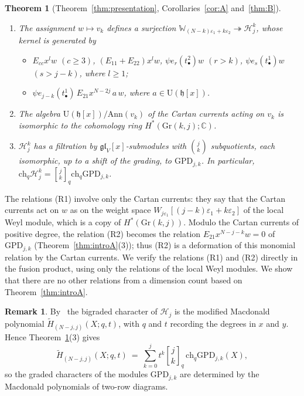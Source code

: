 \documentclass[11pt]{amsart}
\numberwithin{equation}{section}
\newtheorem{introthm}{Theorem}
\theoremstyle{definition}
\newtheorem{remark}[equation]{Remark}
\newcommand{\gl}{\mathfrak{gl}}
\newcommand{\fh}{\mathfrak{h}}
\newcommand{\U}{\mathrm{U}}
\newcommand{\bW}{\mathbb{W}}          %
\newcommand{\GPD}{\mathrm{GPD}}         %
\newcommand{\eps}{\varepsilon}
\newcommand{\ch}{\mathrm{ch}}
\newcommand{\Ann}{\mathrm{Ann}}
\newcommand{\Gr}{\mathrm{Gr}}
\newcommand{\qbinom}[2]{\genfrac{[}{]}{0pt}{}{#1}{#2}_{q}}
\begin{document}
	\begin{introthm}[Theorem~\ref{thm:presentation}, Corollaries~\ref{cor:A} and~\ref{thm:B}]\label{thm:introB}
		\begin{enumerate}
			\item The assignment $w\mapsto v_k$ defines a surjection $\bW_{(N-k)\eps_1+k\eps_2}\twoheadrightarrow\mathcal H_j^k$, whose kernel is generated by
			\begin{itemize}
				\item[(R1)] $E_{cc}x^l w$ $(c\ge3)$, $(E_{11}+E_{22})x^l w$, $\psi e_r(t^2_\bullet)w$ $(r>k)$, $\psi e_s(t^1_\bullet)w$ $(s>j-k)$, where $l\ge 1$;
				\item[(R2)] $\psi e_{j-k}(t^1_\bullet)\,E_{21}x^{N-2j}\,a\,w$, where $a\in\U(\fh[x])$.
			\end{itemize}
			\item The algebra $\U(\fh[x])/\Ann(v_k)$ of the Cartan currents acting on $v_k$ is isomorphic to the cohomology ring $H^*(\Gr(k,j);\mathbb C)$.
			\item $\mathcal H_j^k$ has a filtration by $\gl_V[x]$-submodules with $\binom jk$ subquotients, each isomorphic, up to a shift of the grading, to $\GPD_{j,k}$. In particular, $\ch_q\mathcal H_j^k=\qbinom jk\ch_q\GPD_{j,k}$.
		\end{enumerate}
	\end{introthm}
	
	The relations (R1) involve only the Cartan currents: they say that the Cartan currents act on $w$ as on the weight space $W_{j\eps_1}[(j-k)\eps_1+k\eps_2]$ of the local Weyl module, which is a copy of $H^*(\Gr(k,j))$. Modulo the Cartan currents of positive degree, the relation (R2) becomes the relation $E_{21}x^{N-j-k}w=0$ of $\GPD_{j,k}$ (Theorem~\ref{thm:introA}(3)); thus (R2) is a deformation of this monomial relation by the Cartan currents. We verify the relations (R1) and (R2) directly in the fusion product, using only the relations of the local Weyl modules. We show that there are no other relations from a dimension count based on Theorem~\ref{thm:introA}.
	
	\begin{remark}\label{rem:Macdonald-intro}
		By~\cite{Hai99,Haiman} the bigraded character of $\mathcal H_j$ is the modified Macdonald polynomial $\widetilde H_{(N-j,j)}(X;q,t)$, with $q$ and $t$ recording the degrees in $x$ and $y$. Hence Theorem~\ref{thm:introB}(3) gives
		\[
		\widetilde H_{(N-j,j)}(X;q,t)\ =\ \sum_{k=0}^{j}t^k\qbinom jk\,\ch_q\GPD_{j,k}(X),
		\]
		so the graded characters of the modules $\GPD_{j,k}$ are determined by the Macdonald polynomials of two-row diagrams.
	\end{remark}
	
\end{document}
